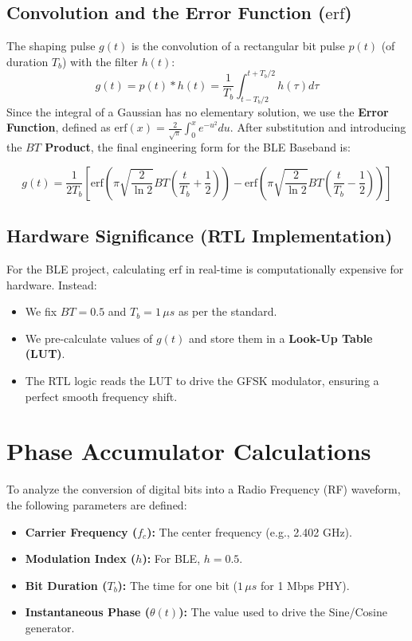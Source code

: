 \documentclass[12pt,singleside,a4paper]{report}
\begin{document}
\subsection{Convolution and the Error Function ($\text{erf}$)}
The shaping pulse $g(t)$ is the convolution of a rectangular bit pulse $p(t)$ (of duration $T_b$) with the filter $h(t)$:
\begin{equation}
g(t) = p(t) * h(t) = \frac{1}{T_b} \int_{t-T_b/2}^{t+T_b/2} h(\tau) d\tau
\end{equation}
Since the integral of a Gaussian has no elementary solution, we use the \textbf{Error Function}, defined as $\text{erf}(x) = \frac{2}{\sqrt{\pi}} \int_0^x e^{-u^2} du$. After substitution and introducing the \textbf{$BT$ Product}, the final engineering form for the BLE Baseband is:

\begin{equation}
g(t) = \frac{1}{2T_b} \left[ \text{erf}\left( \pi \sqrt{\frac{2}{\ln 2}} BT \left( \frac{t}{T_b} + \frac{1}{2} \right) \right) - \text{erf}\left( \pi \sqrt{\frac{2}{\ln 2}} BT \left( \frac{t}{T_b} - \frac{1}{2} \right) \right) \right]
\end{equation}

\subsection{Hardware Significance (RTL Implementation)}
For the BLE project, calculating $\text{erf}$ in real-time is computationally expensive for hardware. Instead:
\begin{itemize}
    \item We fix $BT = 0.5$ and $T_b = 1\,\mu s$ as per the standard.
    \item We pre-calculate values of $g(t)$ and store them in a \textbf{Look-Up Table (LUT)}.
    \item The RTL logic reads the LUT to drive the GFSK modulator, ensuring a perfect smooth frequency shift.
\end{itemize}


\section{Phase Accumulator Calculations}


To analyze the conversion of digital bits into a Radio Frequency (RF) waveform, the following parameters are defined:
\begin{itemize}
    \item \textbf{Carrier Frequency ($f_c$):} The center frequency (e.g., 2.402 GHz).
    \item \textbf{Modulation Index ($h$):} For BLE, $h = 0.5$.
    \item \textbf{Bit Duration ($T_b$):} The time for one bit ($1 \, \mu s$ for 1 Mbps PHY).
    \item \textbf{Instantaneous Phase ($\theta(t)$):} The value used to drive the Sine/Cosine generator.
\end{itemize}
\end{document}
